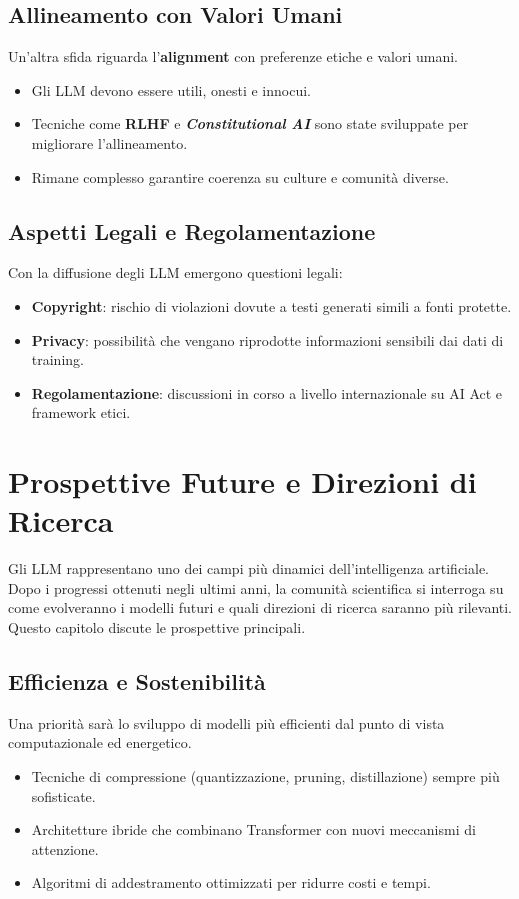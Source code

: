 \subsection{Allineamento con Valori Umani}
Un'altra sfida riguarda l'\textbf{alignment} con preferenze etiche e valori umani.
\begin{itemize}
    \item Gli LLM devono essere utili, onesti e innocui.
    \item Tecniche come \textbf{RLHF} e \textbf{\textit{Constitutional AI}} sono state sviluppate 
    per migliorare l'allineamento.
    \item Rimane complesso garantire coerenza su culture e comunità diverse.
\end{itemize}

\subsection{Aspetti Legali e Regolamentazione}
Con la diffusione degli LLM emergono questioni legali:
\begin{itemize}
    \item \textbf{Copyright}: rischio di violazioni dovute a testi generati simili a fonti protette.
    \item \textbf{Privacy}: possibilità che vengano riprodotte informazioni sensibili dai dati di training.
    \item \textbf{Regolamentazione}: discussioni in corso a livello internazionale su AI Act e framework etici.
\end{itemize}

\newpage
\section{Prospettive Future e Direzioni di Ricerca}

Gli LLM rappresentano uno dei campi più dinamici dell'intelligenza artificiale. 
Dopo i progressi ottenuti negli ultimi anni, la comunità scientifica 
si interroga su come evolveranno i modelli futuri e quali direzioni di ricerca 
saranno più rilevanti. 
Questo capitolo discute le prospettive principali.

\subsection{Efficienza e Sostenibilità}
Una priorità sarà lo sviluppo di modelli più efficienti dal punto di vista computazionale ed energetico.
\begin{itemize}
    \item Tecniche di compressione (quantizzazione, pruning, distillazione) sempre più sofisticate.
    \item Architetture ibride che combinano Transformer con nuovi meccanismi di attenzione.
    \item Algoritmi di addestramento ottimizzati per ridurre costi e tempi.
\end{itemize}


